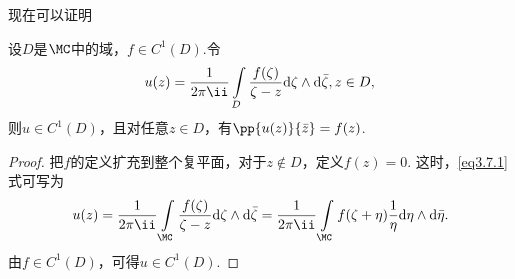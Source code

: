 现在可以证明
\begin{theorem}\label{thm3.7.3}
设$D$是$\MC$中的域，$f\in C^1(D)$.令
\begin{equation}\label{eq3.7.1}
u(z)=\frac1{2\pi\ii}\int\limits_D\frac{f(\zeta)}{\zeta-z}\textrm d\zeta\wedge\textrm d\bar \zeta,z\in D,
\end{equation}
则$u\in C^1(D)$，且对任意$z\in D$，有$\pp{u(z)}{\bar z}=f(z)$.
\end{theorem}
\begin{proof}
把$f$的定义扩充到整个复平面，对于$z\notin D$，定义$f(z)=0$. 这时，\eqref{eq3.7.1} 式可写为
\[u(z)=\frac1{2\pi\ii}\int\limits_\MC\frac{f(\zeta)}{\zeta-z}\textrm d\zeta\wedge\textrm d\bar\zeta=\frac1{2\pi\ii}\int\limits_\MC f(\zeta+\eta)\frac1\eta\textrm d\eta\wedge\textrm d\bar\eta.\]
由$f\in C^1(D)$，可得$u\in C^1(D)$.


\end{proof}
